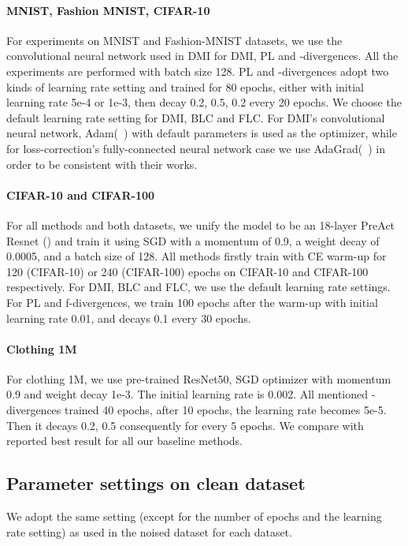 \documentclass{article}
\begin{document}
\paragraph{MNIST, Fashion MNIST, CIFAR-10}
For experiments on MNIST and Fashion-MNIST datasets, we use the convolutional neural network used in DMI for DMI, PL and -divergences. All the experiments are performed with batch size 128. PL and -divergences adopt two kinds of learning rate setting and trained for 80 epochs, either with initial learning rate 5e-4 or 1e-3, then decay 0.2, 0.5, 0.2 every 20 epochs. We choose the default learning rate setting for DMI, BLC and FLC. For DMI's convolutional neural network, Adam(~\cite{Kingma2014AdamAM}) with default parameters is used as the optimizer, while for loss-correction's fully-connected neural network case we use AdaGrad(~\cite{Duchi2010}) in order to be consistent with their works.

\paragraph{CIFAR-10 and CIFAR-100}
For all methods and both datasets, we unify the model to be an 18-layer PreAct Resnet (\cite{he2016identity}) and train it using SGD with a momentum of
0.9, a weight decay of 0.0005, and a batch size of 128. All methods firstly train with CE warm-up for 120 (CIFAR-10) or 240 (CIFAR-100) epochs on CIFAR-10 and CIFAR-100 respectively. For DMI, BLC and FLC, we use the default learning rate settings. For PL and f-divergences, we train 100 epochs after the warm-up with initial learning rate 0.01, and decays 0.1 every 30 epochs.

\paragraph{Clothing 1M}
For clothing 1M, we use pre-trained ResNet50, SGD optimizer with momentum 0.9 and weight decay 1e-3. The initial learning rate is 0.002. All mentioned -divergences trained 40 epochs, after 10 epochs, the learning rate becomes 5e-5. Then it decays 0.2, 0.5 consequently for every 5 epochs. We compare with reported best result for all our baseline methods.

\subsection{Parameter settings on clean dataset}
We adopt the same setting (except for the number of epochs and the learning rate setting) as used in the noised dataset for each dataset.
\end{document}
